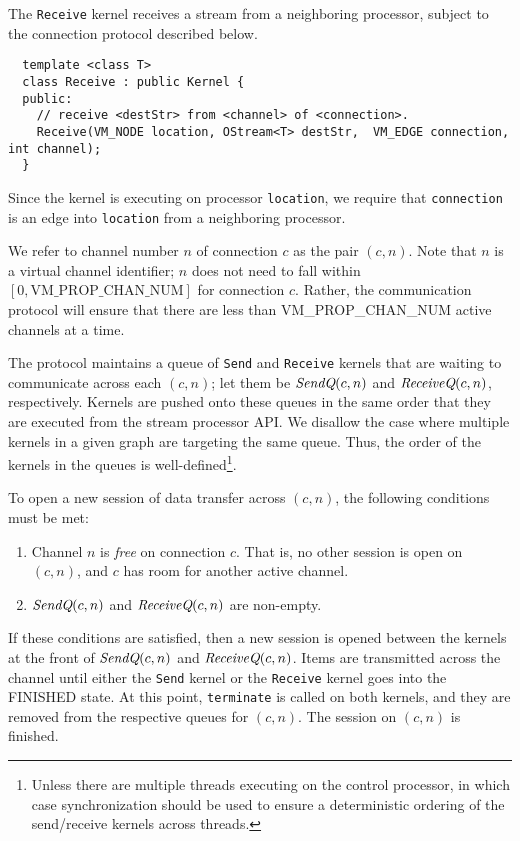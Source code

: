  The {\tt Receive} kernel receives a stream from a
neighboring processor, subject to the connection protocol described
below.  
{\small
\begin{verbatim}
  template <class T>
  class Receive : public Kernel {
  public:
    // receive <destStr> from <channel> of <connection>.
    Receive(VM_NODE location, OStream<T> destStr,  VM_EDGE connection, int channel);
  }  
\end{verbatim}}
Since the kernel is executing on processor {\tt location}, we require
that {\tt connection} is an edge into {\tt location} from a
neighboring processor.

 We refer to channel number $n$ of
connection $c$ as the pair $(c, n)$.  Note that $n$ is a virtual
channel identifier; $n$ does not need to fall within $[0,
\mbox{VM\_PROP\_CHAN\_NUM}]$ for connection $c$.  Rather, the
communication protocol will ensure that there are less than
VM\_PROP\_CHAN\_NUM active channels at a time.

The protocol maintains a queue of {\tt Send} and {\tt Receive} kernels
that are waiting to communicate across each $(c, n)$; let them be
$\mbox{\it SendQ}(c, n)$ and $\mbox{\it ReceiveQ}(c, n)$, respectively.  Kernels
are pushed onto these queues in the same order that they are executed
from the stream processor API.  We disallow the case where multiple
kernels in a given graph are targeting the same queue.  Thus, the
order of the kernels in the queues is well-defined\footnote{Unless
there are multiple threads executing on the control processor, in
which case synchronization should be used to ensure a deterministic
ordering of the send/receive kernels across threads.}.

To open a new session of data transfer across $(c, n)$, the following
conditions must be met:
\begin{enumerate}

\item Channel $n$ is {\it free} on connection $c$.  That is, no other
session is open on $(c, n)$, and $c$ has room for another active
channel.

\item $\mbox{\it SendQ}(c, n)$ and $\mbox{\it ReceiveQ}(c, n)$ are non-empty.

\end{enumerate}
If these conditions are satisfied, then a new session is opened
between the kernels at the front of $\mbox{\it SendQ}(c, n)$ and
$\mbox{\it ReceiveQ}(c, n)$.  Items are transmitted across the channel until
either the {\tt Send} kernel or the {\tt Receive} kernel goes into the
FINISHED state.  At this point, {\tt terminate} is called on both
kernels, and they are removed from the respective queues for $(c, n)$.
The session on $(c, n)$ is finished.

